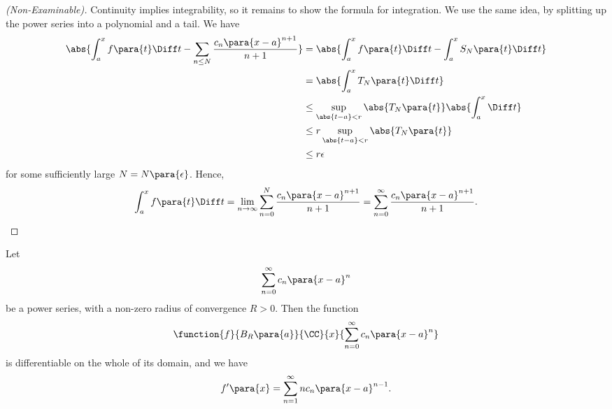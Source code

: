 \begin{proof}[(Non-Examinable)]
    Continuity implies integrability, so it remains to show the formula for integration. We use the same idea, by splitting up the power series into a polynomial and a tail. We have
    \begin{align*}
        \abs{\int_{a}^{x} f\para{t} \Diff t - \sum_{n \leq N} \frac{c_n \para{x - a}^{n + 1}}{n + 1}} &= \abs{\int_{a}^{x} f\para{t} \Diff t - \int_{a}^{x} S_N\para{t} \Diff t} \\
        &= \abs{\int_{a}^{x} T_N\para{t} \Diff t} \\
        &\leq \sup_{\abs{t - a} < r} \abs{T_N \para{t}} \abs{\int_{a}^{x} \Diff t} \\
        &\leq r \sup_{\abs{t - a} < r} \abs{T_N \para{t}} \\
        &\leq r \epsilon
    \end{align*}
    for some sufficiently large \(N = N\para{\epsilon}\). Hence,
    \[
        \int_{a}^{x} f\para{t} \Diff t = \lim_{n \to \infty} \sum_{n = 0}^{N} \frac{c_n \para{x - a}^{n + 1}}{n + 1} = \sum_{n = 0}^{\infty} \frac{c_n \para{x - a}^{n + 1}}{n + 1}.
    \]
\end{proof}

\begin{proposition}
    \label{prop:differentiability-of-power-series-term-by-term}%
    Let
    \[
        \sum_{n = 0}^{\infty} c_n \para{x - a}^{n}
    \]
    be a power series, with a non-zero radius of convergence \(R > 0\). Then the function
    \[
        \function{f}{B_R \para{a}}{\CC}{x}{\sum_{n = 0}^{\infty} c_n \para{x - a}^n}
    \]
    is differentiable on the whole of its domain, and we have
    \[
        f'\para{x} = \sum_{n = 1}^{\infty} n c_n \para{x - a}^{n - 1}.
    \]
\end{proposition}

